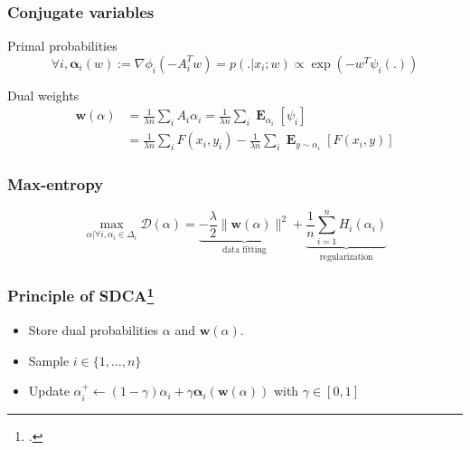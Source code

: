\documentclass{beamer}
\DeclareMathOperator{\1}{\mathbb{1}}
\DeclareMathOperator{\E}{\mathbf{E}}
\begin{document}
\begin{frame}
\frametitle{Conjugate variables}

Primal probabilities
\begin{equation*}
	\label{primal to dual}
	\forall i, \bm \alpha_i(w) := \nabla\phi_i(-A_i^Tw) = p(.|x_i; w) \propto \exp(-w^T \psi_i(.))
\end{equation*}

Dual weights
\begin{align*}
	\label{dual to primal}
	\bm w(\alpha) 
	& =   \frac{1}{\lambda n} \sum_i A_i \alpha_i = \frac{1}{\lambda n} \sum_i \E_{\alpha_i} [\psi_i] \\
	& =\frac{1}{\lambda n} \sum_i F(x_i, y_i) - \frac{1}{\lambda n} \sum_i \E_{y \sim \alpha_i} [F(x_i, y)]
\end{align*}


\end{frame}
\begin{frame}
	\frametitle{Max-entropy}
	
\begin{equation*}
	\max_{\alpha | \forall i, \alpha_i \in \Delta_i} \mathscr{D}(\alpha) = \underbrace{-\frac{\lambda}{2} \| \bm w(\alpha) \|^2}_\text{data fitting} + \underbrace{ \frac{1}{n} \sum_{i=1}^n H_i(\alpha_i)}_\text{regularization}
\end{equation*}

\begin{center}
\end{center}
	
\end{frame}
\begin{frame}
\frametitle{Principle of SDCA\footcite{shalev-shwartz_accelerated_2013-1}}
\begin{itemize}
	\item Store dual probabilities $\alpha$ and $\bm w(\alpha)$.
	\item Sample $i \in \{1,\dots ,n\}$
	\item Update $\alpha_i^+ \leftarrow (1-\gamma) \alpha_i + \gamma \bm \alpha_i(\bm w(\alpha))$ with $\gamma \in [0, 1]$
\end{itemize}

\end{frame}
\end{document}
